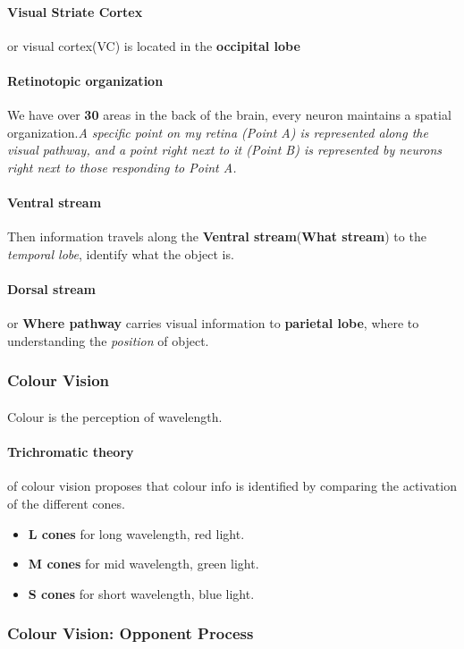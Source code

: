 \documentclass{article}
\begin{document}
	\paragraph{Visual Striate Cortex} or visual cortex(VC) is located in the \textbf{occipital lobe}
	\paragraph{Retinotopic organization} We have over \textbf{30} areas in the back of the brain, every neuron maintains a spatial organization.\emph{A specific point on my retina (Point A) is represented along the visual pathway, and a point right next to it (Point B) is represented by neurons right next to those responding to Point A.}
	\paragraph{Ventral stream} Then information travels along the \textbf{Ventral stream}(\textbf{What stream}) to the \emph{temporal lobe}, identify what the object is.
	\paragraph{Dorsal stream} or \textbf{Where pathway} carries visual information to \textbf{parietal lobe}, where to understanding the \emph{position} of object.
	\subsubsection{Colour Vision}
	\paragraph{} Colour is the perception of wavelength.
	\paragraph{Trichromatic theory} of colour vision proposes that colour info is identified by comparing the activation of the different cones.
	\begin{itemize}
		\item \textbf{L cones} for long wavelength, red light.
		\item \textbf{M cones} for mid wavelength, green light.
		\item \textbf{S cones} for short wavelength, blue light.
	\end{itemize}
	\subsubsection{Colour Vision: Opponent Process}
\end{document}

